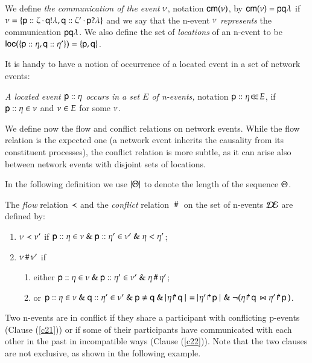  We define {\em the communication of the event} $\nu$, notation
 ${\sf cm}(\nu)$, by ${\sf cm}(\nu)={\sf p}{\sf q}\lambda$ if
 $\nu=\{{\sf p}:: \zeta\,{\cdot}\,{\sf q}!\lambda,
   {\sf q}:: \zeta'\,{\cdot}\,{\sf p}?\lambda\}$ and we say that the
 n-event $\nu$ \emph{represents} the communication
 ${\sf p}{\sf q}\lambda$.  We also define the set of \emph{locations} of an
 n-event to be ${\sf loc}(\{{\sf p}:: \eta, {\sf q}:: \eta'\})
 = \{{\sf p},{\sf q}\}$.

 It is handy to have a notion of occurrence of a located event in
a set of network events: 
 
 \begin{definition}\label{olesne}
   {\em A located event ${\sf p}:: \eta$ occurs in a set $E$ of
     n-events,} notation ${\sf p}:: \eta\!\in\!\in\!E$, if
   ${\sf p}:: \eta\in\nu$ and $\nu\in E$ for some
   $\nu$.
 \end{definition} 

We define now the flow and conflict relations on network
events. While the flow relation is the expected one (a network event
inherits the causality from its constituent processes), the conflict
relation is more subtle, as it can arise also between network
events with disjoint  sets of locations. 

 In the following definition we use $|\Theta|$ to denote the length of
 the sequence $\Theta$. 
\begin{definition} %
The \emph{flow} relation $\prec$ and the \emph{conflict} relation
$~\#~$ on the set of n-events $\mathcal{D\!E}$ are defined by:

\begin{enumerate}
\item{} 
$\nu \prec\nu '$ if 
$
{\sf p}:: \eta\in \nu 
~\&~{\sf p}:: \eta'\in\nu' ~\&~ \eta  <  \eta' $; 
\item{} 
  $\nu \,\#\,\nu '$ if 
 \begin{enumerate}
\item \label{c21} either
  $  {\sf p}:: \eta\in \nu 
~\&~{\sf p}:: \eta'\in\nu'~\&~\eta \,\#\, \eta' $;
\item\label{c22}
 or $\locev{\pp}{\procev}\in \netev 
~\&~\locev{\q}{\procev'}\in\netev' ~\&~\pp \neq \q ~\&~
\cardin{\projb\procev\q} = \cardin{\projb{\procev'}\pp}   ~\&~
\neg(\dualev{\projb\procev\q}{\projb{\procev'}\pp})$. 
\end{enumerate}
\end{enumerate}
\end{definition}
%
Two n-events are in conflict if they share a participant
with conflicting p-events (Clause (\ref{c21}))
or if some of their participants have communicated with each other in the past
in incompatible ways (Clause (\ref{c22})).  Note that the two
clauses are not exclusive, as shown in the following example. 


